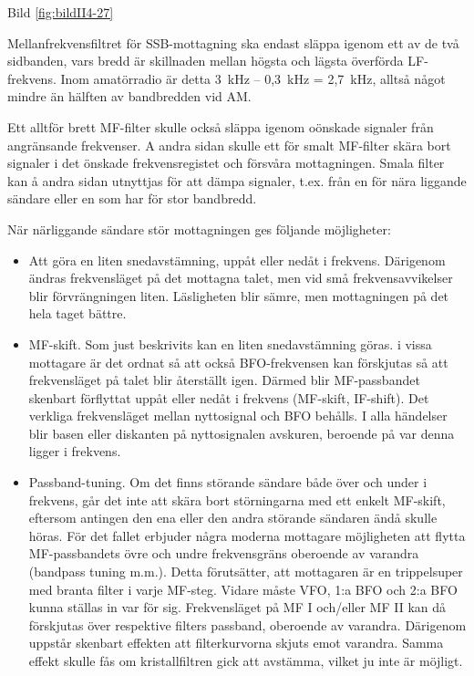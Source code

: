 Bild \ref{fig:bildII4-27}

Mellanfrekvensfiltret för SSB-mottagning ska endast släppa igenom
ett av de två sidbanden, vars bredd är skillnaden mellan högsta och
lägsta överförda LF-frekvens.  Inom amatörradio är detta 3~kHz -- 0,3~kHz
= 2,7~kHz, alltså något mindre än hälften av bandbredden vid AM.

Ett alltför brett MF-filter skulle också släppa igenom oönskade
signaler från angränsande frekvenser. A andra sidan skulle ett för
smalt MF-filter skära bort signaler i det önskade frekvensregistet och
försvåra mottagningen. Smala filter kan å andra sidan utnyttjas för
att dämpa signaler, t.ex. från en för nära liggande sändare eller en som
har för stor bandbredd.

När närliggande sändare stör mottagningen ges följande möjligheter:
\begin{itemize}
  \item Att göra en liten snedavstämning, uppåt eller nedåt i
    frekvens. Därigenom ändras frekvensläget på det mottagna talet,
    men vid små frekvensavvikelser blir förvrängningen
    liten. Läsligheten blir sämre, men mottagningen på det hela taget
    bättre.

  \item MF-skift. Som just beskrivits kan en liten snedavstämning
    göras. i vissa mottagare är det ordnat så att också BFO-frekvensen
    kan förskjutas så att frekvensläget på talet blir återställt
    igen. Därmed blir MF-passbandet skenbart förflyttat uppåt
    eller nedåt i frekvens (MF-skift, IF-shift).  Det verkliga
    frekvensläget mellan nyttosignal och BFO behålls. I alla händelser
    blir basen eller diskanten på nyttosignalen avskuren, beroende på
    var denna ligger i frekvens.

  \item Passband-tuning. Om det finns störande sändare både över och
    under i frekvens, går det inte att skära bort störningarna med ett
    enkelt MF-skift, eftersom antingen den ena eller den andra
    störande sändaren ändå skulle höras. För det fallet erbjuder några
    moderna mottagare möjligheten att flytta MF-passbandets övre och
    undre frekvensgräns oberoende av varandra (bandpass tuning
    m.m.). Detta förutsätter, att mottagaren är en trippelsuper med
    branta filter i varje MF-steg.  Vidare måste VFO, 1:a BFO och 2:a
    BFO kunna ställas in var för sig. Frekvensläget på MF I och/eller
    MF II kan då förskjutas över respektive filters passband,
    oberoende av varandra. Därigenom uppstår skenbart effekten att
    filterkurvorna skjuts emot varandra. Samma effekt skulle fås om
    kristallfiltren gick att avstämma, vilket ju inte är möjligt.
\end{itemize}

